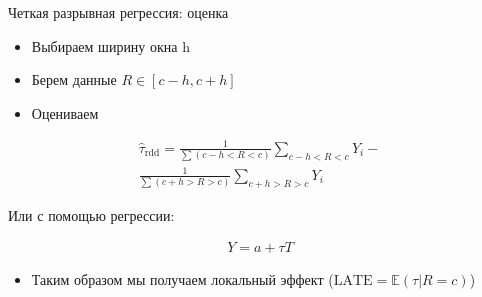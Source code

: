 \begin{frame}{Четкая разрывная регрессия: оценка}

\begin{itemize}
    \item Выбираем ширину окна h
    \item Берем данные $R \in \left[c-h, c+h\right]$
    \item Оцениваем
\end{itemize}
    
    
    \begin{gather*}
    \hat \tau_{\text{rdd}} = \frac{1}{\sum(c - h < R < c)}\sum_{c - h < R < c} Y_i - \\
    \frac{1}{\sum(c + h > R > c)} \sum_{c + h > R > c} Y_i
    \end{gather*}
    
    Или с помощью регрессии:
    
    \begin{gather*}
    Y = a + \tau T
    \end{gather*}
    
    \begin{itemize}
        \item Таким образом мы получаем локальный эффект ($\text{LATE} = \mathbb{E}(\tau|R = c)$)
    \end{itemize}
\end{frame}





